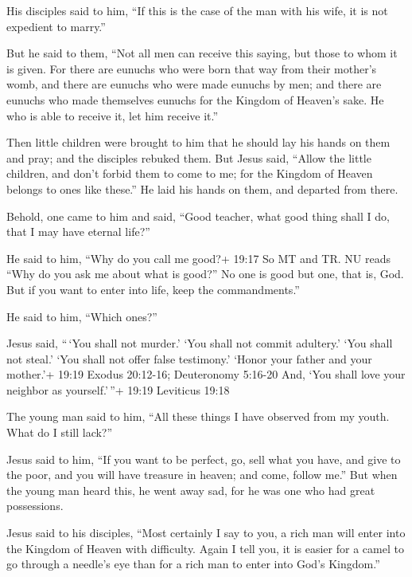  His disciples said to him, ``If this is the case of the
man with his wife, it is not expedient to marry.''

 But he said to them, ``Not all men can receive this
saying, but those to whom it is given.  For there are
eunuchs who were born that way from their mother's womb, and there are
eunuchs who were made eunuchs by men; and there are eunuchs who made
themselves eunuchs for the Kingdom of Heaven's sake. He who is able to
receive it, let him receive it.''

 Then little children were brought to him that he should
lay his hands on them and pray; and the disciples rebuked them.
 But Jesus said, ``Allow the little children, and don't
forbid them to come to me; for the Kingdom of Heaven belongs to ones
like these.''  He laid his hands on them, and departed from
there.

 Behold, one came to him and said, ``Good teacher, what
good thing shall I do, that I may have eternal life?''

 He said to him, ``Why do you call me good?+ 19:17 So MT
and TR. NU reads ``Why do you ask me about what is good?'' No one is
good but one, that is, God. But if you want to enter into life, keep the
commandments.''

 He said to him, ``Which ones?''

Jesus said, ``\,`You shall not murder.' `You shall not commit adultery.'
`You shall not steal.' `You shall not offer false testimony.'
 `Honor your father and your mother.'+ 19:19 Exodus
20:12-16; Deuteronomy 5:16-20 And, `You shall love your neighbor as
yourself.'\,''+ 19:19 Leviticus 19:18

 The young man said to him, ``All these things I have
observed from my youth. What do I still lack?''

 Jesus said to him, ``If you want to be perfect, go, sell
what you have, and give to the poor, and you will have treasure in
heaven; and come, follow me.''  But when the young man
heard this, he went away sad, for he was one who had great possessions.

 Jesus said to his disciples, ``Most certainly I say to
you, a rich man will enter into the Kingdom of Heaven with difficulty.
 Again I tell you, it is easier for a camel to go through a
needle's eye than for a rich man to enter into God's Kingdom.''

